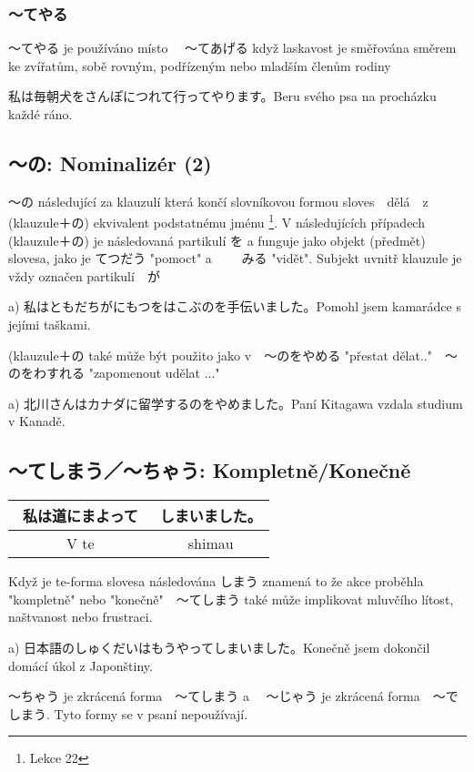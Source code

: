 \subsubsection{〜てやる}
〜てやる je používáno místo 　〜てあげる když laskavost je směřována směrem ke zvířatům, sobě rovným, podřízeným nebo mladším členům rodiny

私は毎朝犬をさんぽにつれて行ってやります。Beru svého psa na procházku každé ráno.


\subsection{〜の: Nominalizér (2)}

〜の následující za klauzulí která končí slovníkovou formou sloves　dělá　z　(klauzule＋の) ekvivalent podstatnému jménu \footnote{Lekce 22}. V následujících případech　(klauzule＋の) je následovaná partikulí を a funguje jako objekt (předmět) slovesa, jako je てつだう "pomoct" a 　　みる "vidět". Subjekt uvnitř klauzule je vždy označen partikulí　が


a) 私はともだちがにもつをはこぶのを手伝いました。Pomohl jsem kamarádce s jejími taškami.

(klauzule＋の také může být použito jako v　〜のをやめる "přestat dělat.."　〜のをわすれる "zapomenout udělat ..."


a) 北川さんはカナダに留学するのをやめました。Paní Kitagawa vzdala studium v Kanadě.



\subsection{〜てしまう／〜ちゃう: Kompletně/Konečně}
\begin{center}
\begin{tabular}{||c|c||}
\hline
私は道にまよって　&しまいました。\\
\hline
V te& shimau\\
\hline
\end{tabular}
\end{center}

Když je te-forma slovesa následována しまう znamená to že akce proběhla "kompletně" nebo "konečně"　〜てしまう také může implikovat mluvčího lítost, naštvanost nebo frustraci.

a) 日本語のしゅくだいはもうやってしまいました。Konečně jsem dokončil domácí úkol z Japonštiny.

〜ちゃう je zkrácená forma　〜てしまう a 　〜じゃう je zkrácená forma　〜でしまう. Tyto formy se v psaní nepoužívají.



